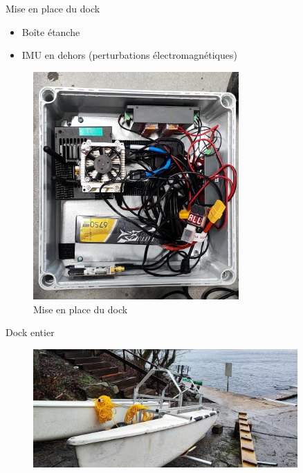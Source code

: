 \documentclass[pdftex,beamer,aspectratio=169]{beamer}
\theoremstyle{definition}
\theoremstyle{example}
\theoremstyle{plain}
\begin{document}
\begin{frame}[fragile]{Mise en place du dock}
  \begin{minipage}{0.5\textwidth}
    \begin{itemize}
      \item Boîte étanche
      \item IMU en dehors (perturbations électromagnétiques)
    \end{itemize}
  \end{minipage}
  \begin{minipage}{0.49\textwidth}
    \begin{figure}[H]
      \centering
      \includegraphics[width=0.7\textwidth]{dock_box_inside.jpg}
      \caption{Mise en place du dock}
    \end{figure}
  \end{minipage}
\end{frame}

\begin{frame}[fragile]{Dock entier}
  \begin{figure}
    \centering
    \includegraphics[width=0.9\textwidth]{dock.jpg}
  \end{figure}
\end{frame}
\end{document}
